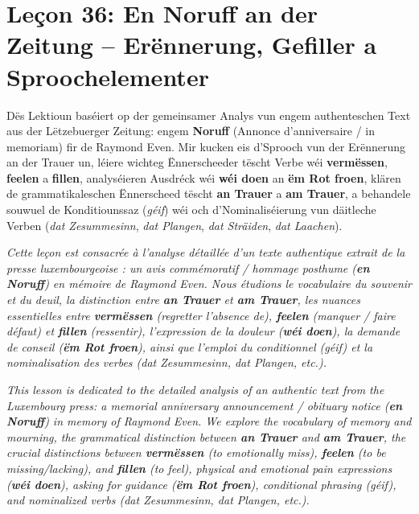 \chapter[Leçon 36: En Noruff an der Zeitung -- Erënnerung a Sproochelementer]{Leçon 36: En Noruff an der Zeitung -- Erënnerung, Gefiller a Sproochelementer}

Dës Lektioun baséiert op der gemeinsamer Analys vun engem authenteschen Text aus der Lëtzebuerger Zeitung: engem \textbf{Noruff} (Annonce d'anniversaire / in memoriam) fir de Raymond Even. Mir kucken eis d'Sprooch vun der Erënnerung an der Trauer un, léiere wichteg Ënnerscheeder tëscht Verbe wéi \textbf{vermëssen}, \textbf{feelen} a \textbf{fillen}, analyséieren Ausdréck wéi \textbf{wéi doen} an \textbf{ëm Rot froen}, klären de grammatikaleschen Ënnerscheed tëscht \textbf{an Trauer} a \textbf{am Trauer}, a behandele souwuel de Konditiounssaz (\textit{géif}) wéi och d'Nominaliséierung vun däitleche Verben (\textit{dat Zesummesinn}, \textit{dat Plangen}, \textit{dat Sträiden}, \textit{dat Laachen}).

\textit{Cette leçon est consacrée à l'analyse détaillée d'un texte authentique extrait de la presse luxembourgeoise : un avis commémoratif / hommage posthume (\textbf{en Noruff}) en mémoire de Raymond Even. Nous étudions le vocabulaire du souvenir et du deuil, la distinction entre \textbf{an Trauer} et \textbf{am Trauer}, les nuances essentielles entre \textbf{vermëssen} (regretter l'absence de), \textbf{feelen} (manquer / faire défaut) et \textbf{fillen} (ressentir), l'expression de la douleur (\textbf{wéi doen}), la demande de conseil (\textbf{ëm Rot froen}), ainsi que l'emploi du conditionnel (\textit{géif}) et la nominalisation des verbes (\textit{dat Zesummesinn}, \textit{dat Plangen}, etc.).}

\textit{This lesson is dedicated to the detailed analysis of an authentic text from the Luxembourg press: a memorial anniversary announcement / obituary notice (\textbf{en Noruff}) in memory of Raymond Even. We explore the vocabulary of memory and mourning, the grammatical distinction between \textbf{an Trauer} and \textbf{am Trauer}, the crucial distinctions between \textbf{vermëssen} (to emotionally miss), \textbf{feelen} (to be missing/lacking), and \textbf{fillen} (to feel), physical and emotional pain expressions (\textbf{wéi doen}), asking for guidance (\textbf{ëm Rot froen}), conditional phrasing (\textit{géif}), and nominalized verbs (\textit{dat Zesummesinn}, \textit{dat Plangen}, etc.).}

